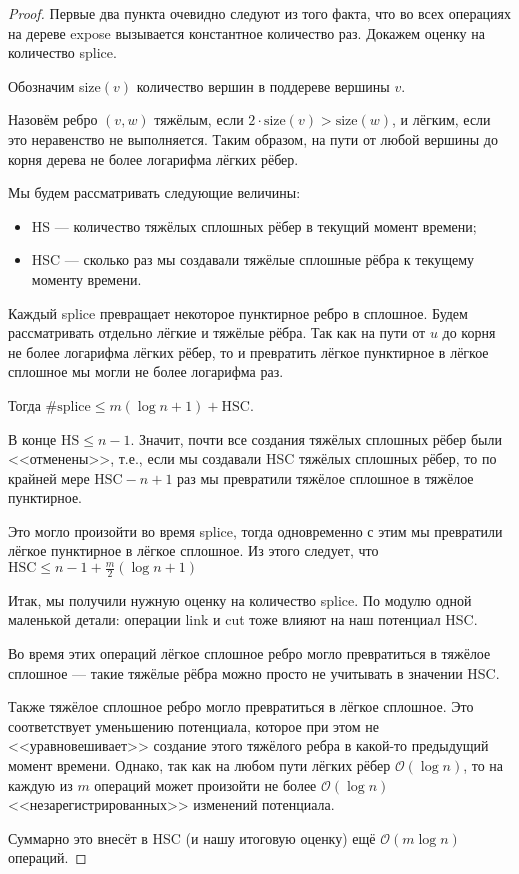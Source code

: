 \begin{proof}

Первые два пункта очевидно следуют из того факта, что во всех операциях на дереве expose вызывается константное количество раз. Докажем оценку на количество splice.

Обозначим size$(v)$ количество вершин в поддереве вершины $v$.

Назовём ребро $(v, w)$ тяжёлым, если $2 \cdot \text{size}(v) > \text{size}(w)$, и лёгким, если это неравенство не выполняется. Таким образом, на пути от любой вершины до корня дерева не более логарифма лёгких рёбер.

Мы будем рассматривать следующие величины:

\begin{itemize}
	\item HS --- количество тяжёлых сплошных рёбер в текущий момент времени;
	\item HSC --- сколько раз мы создавали тяжёлые сплошные рёбра к текущему моменту времени.
\end{itemize}

Каждый splice превращает некоторое пунктирное ребро в сплошное. Будем рассматривать отдельно лёгкие и тяжёлые рёбра. Так как на пути от $u$ до корня не более логарифма лёгких рёбер, то и превратить лёгкое пунктирное в лёгкое сплошное мы могли не более логарифма раз.

Тогда $\# \text{splice} \leq m (\log{n} + 1) + \text{HSC}$.

В конце $\text{HS} \leq n - 1$. Значит, почти все создания тяжёлых сплошных рёбер были <<отменены>>, т.е., если мы создавали HSC тяжёлых сплошных рёбер, то по крайней мере $\text{HSC} - n + 1$ раз мы превратили тяжёлое сплошное в тяжёлое пунктирное.

Это могло произойти во время splice, тогда одновременно с этим мы превратили лёгкое пунктирное в лёгкое сплошное. Из этого следует, что $\text{HSC} \leq n - 1 + \frac{m}{2}(\log{n} + 1)$

Итак, мы получили нужную оценку на количество splice. По модулю одной маленькой детали: операции link и cut тоже влияют на наш потенциал HSC.

Во время этих операций лёгкое сплошное ребро могло превратиться в тяжёлое сплошное --- такие тяжёлые рёбра можно просто не учитывать в значении HSC.

Также тяжёлое сплошное ребро могло превратиться в лёгкое сплошное. Это соответствует уменьшению потенциала, которое при этом не <<уравновешивает>> создание этого тяжёлого ребра в какой-то предыдущий момент времени. Однако, так как на любом пути лёгких рёбер $\mathcal{O}(\log{n})$, то на каждую из $m$ операций может произойти не более $\mathcal{O}(\log{n})$ <<незарегистрированных>> изменений потенциала.

Суммарно это внесёт в HSC (и нашу итоговую оценку) ещё $\mathcal{O}(m \log{n})$ операций.

\end{proof}

